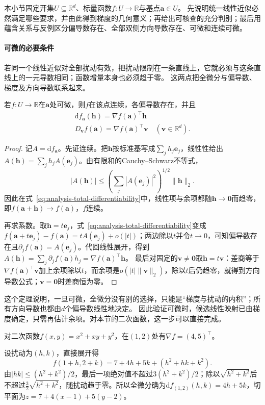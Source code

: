 本小节固定开集$U\subseteq\mathbb R^d$、标量函数$f:U\to\mathbb R$与基点$\bm a\in U$。
先说明统一线性近似必然满足哪些要求，并由此得到梯度的几何意义；再给出可核查的充分判别；最后用蕴含关系与反例区分偏导数存在、全部双侧方向导数存在、可微和连续可微。

\paragraph{可微的必要条件}
若同一个线性近似对全部扰动有效，把扰动限制在一条直线上，它就必须与这条直线上的一元导数相同；函数增量本身也必须趋于零。
这两点把全微分与偏导数、梯度及方向导数联系起来。
\begin{theorem}
\label{thm:multivariable-differentiable-necessary}
若$f:U\to\mathbb R$在$\bm a$处可微，则$f$在该点连续，各偏导数存在，并且
\[
 \begin{gathered}
\mathrm df_{\bm a}(\bm h)=\nabla f(\bm a)^\top\bm h\\
D_{\bm v}f(\bm a)=\nabla f(\bm a)^\top\bm v
 \quad(\bm v\in\mathbb R^d).
 \end{gathered}
\]
\end{theorem}
\begin{proof}
记$A=\mathrm df_{\bm a}$。先证连续。把$\bm h$按标准基写成$\sum_jh_j\bm e_j$，线性性给出$A(\bm h)=\sum_jh_jA(\bm e_j)$。由有限和的Cauchy--Schwarz不等式，
\[
 |A(\bm h)|\leq\left(\sum_j|A(\bm e_j)|^2\right)^{1/2}\lVert\bm h\rVert_2.
\]
因此在式~\eqref{eq:analysis-total-differentiability}中，线性项与余项都随$\bm h\to\bm 0$而趋零，即$f(\bm a+\bm h)\to f(\bm a)$，$f$连续。

再求系数。取$\bm h=t\bm e_j$，式~\eqref{eq:analysis-total-differentiability}变成$f(\bm a+t\bm e_j)-f(\bm a)=tA(\bm e_j)+o(|t|)$；两边除以$t$并令$t\to0$，可知偏导数存在且$\partial_jf(\bm a)=A(\bm e_j)$。代回线性展开，得到$A(\bm h)=\sum_j\partial_jf(\bm a)h_j=\nabla f(\bm a)^\top\bm h$。
最后对固定的$\bm v\neq\bm0$取$\bm h=t\bm v$：差商等于$\nabla f(\bm a)^\top\bm v$加上余项除以$t$，而余项是$o(|t|\lVert\bm v\rVert_2)$，除以$t$后仍趋零，就得到方向导数公式；$\bm v=\bm0$时差商恒为零。
\end{proof}
这个定理说明，一旦可微，全微分没有别的选择，只能是“梯度与扰动的内积”；所有方向导数也都由$d$个偏导数线性地决定。
因此验证可微时，候选线性映射已由梯度确定，只需再估计余项。对本节的二次函数，这一步可以直接完成。
\begin{example}[二元二次函数的全微分]
\label{ex:multivariable-quadratic-differential}
对二次函数$f(x,y)=x^2+xy+y^2$，在$(1,2)$处有$\nabla f=(4,5)^\top$。

设扰动为$(h,k)$，直接展开得
\[
 f(1+h,2+k)=7+4h+5k+(h^2+hk+k^2).
\]
由$|hk|\leq(h^2+k^2)/2$，最后一项绝对值不超过$3(h^2+k^2)/2$；除以$\sqrt{h^2+k^2}$后不超过$\tfrac32\sqrt{h^2+k^2}$，随扰动趋于零。所以全微分确为$\mathrm df_{(1,2)}(h,k)=4h+5k$，切平面为$z=7+4(x-1)+5(y-2)$。
\end{example}

